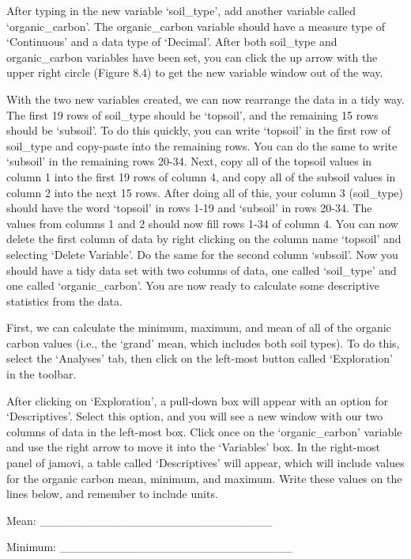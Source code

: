 \documentclass[
  openany]{scrbook}
\begin{document}
After typing in the new variable `soil\_type', add another variable called `organic\_carbon'.
The organic\_carbon variable should have a measure type of `Continuous' and a data type of `Decimal'.
After both soil\_type and organic\_carbon variables have been set, you can click the up arrow with the upper right circle (Figure 8.4) to get the new variable window out of the way.

With the two new variables created, we can now rearrange the data in a tidy way.
The first 19 rows of soil\_type should be `topsoil', and the remaining 15 rows should be `subsoil'.
To do this quickly, you can write `topsoil' in the first row of soil\_type and copy-paste into the remaining rows.
You can do the same to write `subsoil' in the remaining rows 20-34.
Next, copy all of the topsoil values in column 1 into the first 19 rows of column 4, and copy all of the subsoil values in column 2 into the next 15 rows.
After doing all of this, your column 3 (soil\_type) should have the word `topsoil' in rows 1-19 and `subsoil' in rows 20-34.
The values from columns 1 and 2 should now fill rows 1-34 of column 4.
You can now delete the first column of data by right clicking on the column name `topsoil' and selecting `Delete Variable'.
Do the same for the second column `subsoil'.
Now you should have a tidy data set with two columns of data, one called `soil\_type' and one called `organic\_carbon'.
You are now ready to calculate some descriptive statistics from the data.

First, we can calculate the minimum, maximum, and mean of all of the organic carbon values (i.e., the `grand' mean, which includes both soil types).
To do this, select the `Analyses' tab, then click on the left-most button called `Exploration' in the toolbar.

After clicking on `Exploration', a pull-down box will appear with an option for `Descriptives'.
Select this option, and you will see a new window with our two columns of data in the left-most box.
Click once on the `organic\_carbon' variable and use the right arrow to move it into the `Variables' box.
In the right-most panel of jamovi, a table called `Descriptives' will appear, which will include values for the organic carbon mean, minimum, and maximum.
Write these values on the lines below, and remember to include units.

Mean: \_\_\_\_\_\_\_\_\_\_\_\_\_\_\_\_\_\_\_\_\_\_\_\_\_\_\_\_

Minimum: \_\_\_\_\_\_\_\_\_\_\_\_\_\_\_\_\_\_\_\_\_\_\_\_\_\_\_\_
\end{document}
